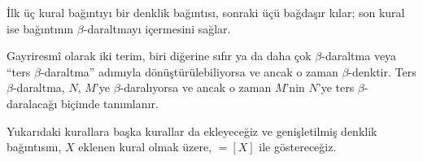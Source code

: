 \documentclass[../../../include/open-logic-section]{subfiles}
\begin{document}
İlk üç kural bağıntıyı bir denklik bağıntısı, sonraki üçü bağdaşır kılar; son
kural ise bağıntının $\beta$-daraltmayı içermesini sağlar.

Gayriresmî olarak iki terim, biri diğerine sıfır ya da daha çok
$\beta$-daraltma veya ``ters $\beta$-daraltma'' adımıyla dönüştürülebiliyorsa
ve ancak o zaman $\beta$-denktir. Ters $\beta$-daraltma, $N$, $M$'ye
$\beta$-daralıyorsa ve ancak o zaman $M$'nin $N$'ye ters
$\beta$-daralacağı biçimde tanımlanır.

Yukarıdaki kurallara başka kurallar da ekleyeceğiz ve genişletilmiş denklik
bağıntısını, $X$ eklenen kural olmak üzere, $\equal[X]$ ile göstereceğiz.
\end{document}
